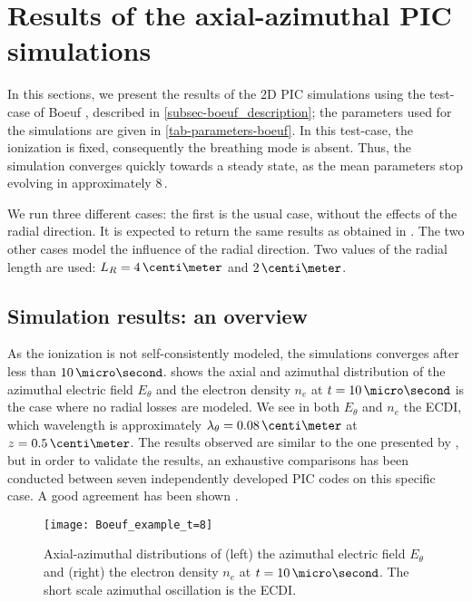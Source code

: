 
\section{Results of the axial-azimuthal PIC simulations}
  \label{sec-Zthetaresults}
  In this sections, we present the results of the \ac{2D} \ac{PIC} simulations using the test-case of Boeuf \citep{boeuf2018}, described in \cref{subsec-boeuf_description}\string; the parameters used for the simulations are given in \cref{tab-parameters-boeuf}.
  In this test-case, the ionization is fixed, consequently the breathing mode is absent.
  Thus, the simulation converges quickly towards a steady state, as the mean parameters stop evolving in approximately 8\,\micro\second.
  
  We run three different cases\string:
  the first is the usual case, without the effects of the radial direction.
  It is expected to return the same results as obtained in \citet{boeuf2018}.
  The two other cases model the influence of the radial direction.
  Two values of the radial length are used\string: $L_R=4\,\centi\meter$ and $2\,\centi\meter$.

  
  \subsection{Simulation results\string: an overview} \label{subsec-boeuf-overview}
    As the ionization is not self-consistently modeled, the simulations converges after less than $10\,\micro\second$.
     shows the axial and azimuthal distribution of the azimuthal electric field $E_{\theta}$ and the electron density $n_e$ at $t=10\,\micro\second$ is the case where no radial losses are modeled.
    We see in both $E_{\theta}$ and $n_e$ the \ac{ECDI}, which wavelength is approximately $\lambda_{\theta} = 0.08\,\centi\meter$ at $z=0.5\,\centi\meter$.
    The results observed are similar to the one presented by \citet{boeuf2018}, but in order to validate the results, an exhaustive comparisons has been conducted between seven independently developed \ac{PIC} codes on this specific case.
    A good agreement has been shown \citep{charoy2019}.
    

    \begin{figure}[hbt]
      \centering
      \texttt{[image: Boeuf\_example\_t=8]}
      \caption{ Axial-azimuthal distributions of (left) the azimuthal electric field $E_{\theta}$ and (right) the electron density $n_e$ at $t=10\,\micro\second$. The short scale azimuthal oscillation is the \ac{ECDI}.} 
      \label{fig-overview_boeuf_neEx}
    \end{figure}

